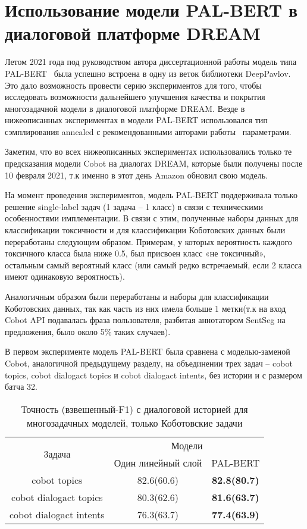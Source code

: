 \section{Использование модели PAL-BERT в диалоговой платформе DREAM} 

Летом 2021 года под руководством автора диссертационной работы модель типа PAL-BERT~\cite{stickland_2019} была успешно встроена в одну из веток библиотеки DeepPavlov. Это дало возможность провести серию экспериментов для того, чтобы исследовать возможности дальнейшего улучшения качества и покрытия многозадачной модели в диалоговой платформе DREAM. Везде в нижеописанных экспериментах в модели PAL-BERT использовался тип сэмплирования annealed с рекомендованными авторами работы~\cite{stickland_2019} параметрами.

Заметим, что во всех нижеописанных экспериментах использовались только те предсказания модели Cobot на диалогах DREAM, которые были получены после 10 февраля 2021, т.к именно в этот день Amazon обновил свою модель.

На момент проведения экспериментов, модель PAL-BERT поддерживала только решение single-label задач (1 задача -- 1 класс) в связи с техническими особенностями имплементации. В связи с этим, полученные наборы данных для классификации токсичности и для классификации Коботовских данных были переработаны следующим образом. Примерам, у которых вероятность каждого токсичного класса была ниже 0.5, был присвоен класс «не токсичный», остальным самый вероятный класс (или самый редко встречаемый, если 2 класса имеют одинаковую вероятность).

Аналогичным образом были переработаны и наборы для классификации Коботовских данных, так как часть из них имела больше 1 метки(т.к на вход Cobot API подавалась фраза пользователя, разбитая аннотатором SentSeg на предложения, было около 5\% таких случаев). 

В первом эксперименте модель PAL-BERT была сравнена с моделью-заменой Cobot, аналогичной предыдущему разделу, на объединении трех задач -- cobot topics, cobot dialogact topics и cobot dialogact intents, без истории и с размером батча 32.

\begin{table}[htbp]
\centering
\caption {Точность (взвешенный-F1) с диалоговой историей для многозадачных моделей, только Коботовские задачи}
\label{mtldream:3}
\begin{tabular}{|c||c|c|} \hline
\multirow{2}{*}{3адача} & \multicolumn{2}{c|}{Модели} \\
\cline{2-3}
 & Один линейный слой & PAL-BERT \\
\hline
\hline
cobot topics & 82.6(60.6) & \textbf{82.8(80.7)} \\
\hline
cobot dialogact topics & 80.3(62.6) & \textbf{81.6(63.7)} \\
\hline
cobot dialogact intents & 76.3(63.7) & \textbf{77.4(63.9)} \\ 
\hline
\end{tabular}
\end{table}

